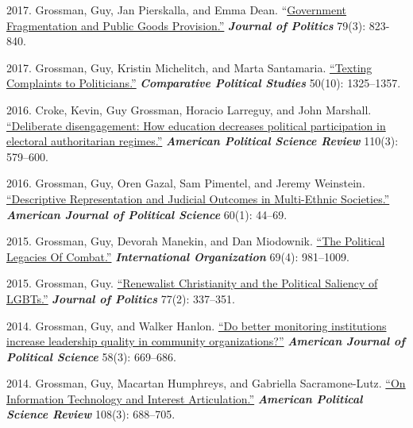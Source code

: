 \documentclass[10pt,a4paper]{article}
\begin{document}
\begin{etaremune}[leftmargin=2.5em, itemsep=8pt, topsep=4pt]
\item \textcolor{secondary}{2017.} Grossman, Guy, Jan Pierskalla, and Emma Dean. ``\href{https://bit.ly/2shkmKo}{Government Fragmentation and Public Goods Provision.''} \textbf{\textit{Journal of Politics}} 79(3): 823-840.

\item \textcolor{secondary}{2017.} Grossman, Guy, Kristin Michelitch, and Marta Santamaria. \href{https://journals.sagepub.com/doi/abs/10.1177/0010414016666862}{``Texting Complaints to Politicians.''} \textbf{\textit{Comparative Political Studies}} 50(10): 1325--1357.

\item \textcolor{secondary}{2016.} Croke, Kevin, Guy Grossman, Horacio Larreguy, and John Marshall. \href{https://bit.ly/2MwSQVg}{``Deliberate disengagement: How education decreases political participation in electoral authoritarian regimes.''} \textbf{\textit{American Political Science Review}} 110(3): 579--600.

\item \textcolor{secondary}{2016.} Grossman, Guy, Oren Gazal, Sam Pimentel, and Jeremy Weinstein. \href{https://bit.ly/1kP3547}{``Descriptive Representation and Judicial Outcomes in Multi-Ethnic Societies.''} \textbf{\textit{American Journal of Political Science}} 60(1): 44--69.

\item \textcolor{secondary}{2015.} Grossman, Guy, Devorah Manekin, and Dan Miodownik. \href{https://bit.ly/2IXe7Fq}{``The Political Legacies Of Combat.''} \textbf{\textit{International Organization}} 69(4): 981--1009.

\item \textcolor{secondary}{2015.} Grossman, Guy. \href{https://bit.ly/2Va3mpE}{``Renewalist Christianity and the Political Saliency of LGBTs.''} \textbf{\textit{Journal of Politics}} 77(2): 337--351.

\item \textcolor{secondary}{2014.} Grossman, Guy, and Walker Hanlon. \href{https://bit.ly/2vBDgMY}{``Do better monitoring institutions increase leadership quality in community organizations?''} \textbf{\textit{American Journal of Political Science}} 58(3): 669--686.

\item \textcolor{secondary}{2014.} Grossman, Guy, Macartan Humphreys, and Gabriella Sacramone-Lutz. \href{https://bit.ly/2IX0jdV}{``On Information Technology and Interest Articulation.''} \textbf{\textit{American Political Science Review}} 108(3): 688--705.


\end{etaremune}
\end{document}
